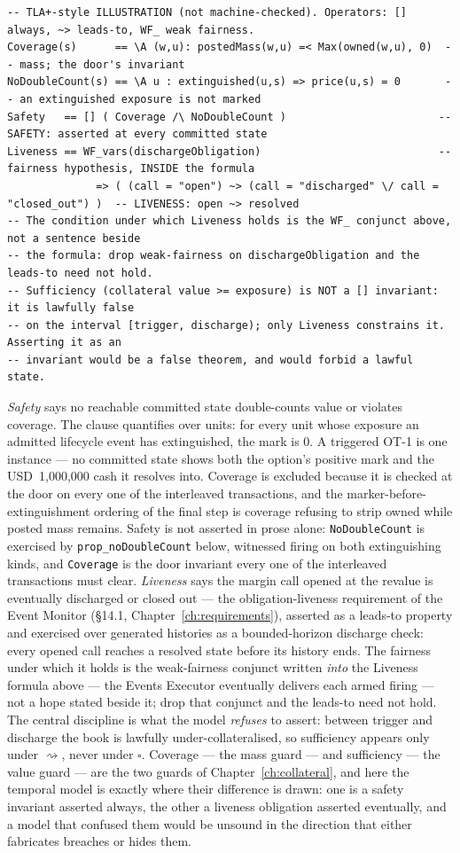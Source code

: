 \documentclass[11pt,a4paper]{article}
\newcommand{\USD}[1]{\mbox{USD~#1}}
\begin{document}
\begin{lstlisting}
-- TLA+-style ILLUSTRATION (not machine-checked). Operators: [] always, ~> leads-to, WF_ weak fairness.
Coverage(s)      == \A (w,u): postedMass(w,u) =< Max(owned(w,u), 0)  -- mass; the door's invariant
NoDoubleCount(s) == \A u : extinguished(u,s) => price(u,s) = 0       -- an extinguished exposure is not marked
Safety   == [] ( Coverage /\ NoDoubleCount )                        -- SAFETY: asserted at every committed state
Liveness == WF_vars(dischargeObligation)                            -- fairness hypothesis, INSIDE the formula
              => ( (call = "open") ~> (call = "discharged" \/ call = "closed_out") )  -- LIVENESS: open ~> resolved
-- The condition under which Liveness holds is the WF_ conjunct above, not a sentence beside
-- the formula: drop weak-fairness on dischargeObligation and the leads-to need not hold.
-- Sufficiency (collateral value >= exposure) is NOT a [] invariant: it is lawfully false
-- on the interval [trigger, discharge); only Liveness constrains it. Asserting it as an
-- invariant would be a false theorem, and would forbid a lawful state.
\end{lstlisting}

\emph{Safety} says no reachable committed state double-counts value or violates coverage.
The clause quantifies over units: for every unit whose exposure an admitted lifecycle event
has extinguished, the mark is $0$. A triggered OT-1 is one instance --- no committed state
shows both the option's positive mark and the \USD{1{,}000{,}000} cash it resolves into. Coverage
is excluded because it is checked at the door on every one of the interleaved transactions,
and the marker-before-extinguishment ordering of the final step is coverage refusing to
strip owned while posted mass remains. Safety is not asserted in prose alone: \texttt{NoDoubleCount} is exercised by
\texttt{prop\_noDoubleCount} below, witnessed firing on both extinguishing kinds, and
\texttt{Coverage} is the door invariant every one of the interleaved transactions must clear.
\emph{Liveness} says the margin call opened at the revalue is eventually discharged or closed
out --- the obligation-liveness requirement of the Event Monitor (\S 14.1,
Chapter~\ref{ch:requirements}), asserted as a leads-to property and exercised over generated
histories as a bounded-horizon discharge check: every opened call reaches a resolved state
before its history ends. The fairness under which it holds is the weak-fairness conjunct
written \emph{into} the Liveness formula above --- the Events Executor eventually delivers each
armed firing --- not a hope stated beside it; drop that conjunct and the leads-to need not
hold. The central discipline is what the model \emph{refuses} to assert: between trigger and
discharge the book is lawfully under-collateralised, so sufficiency appears only under
$\rightsquigarrow$, never under $\square$. Coverage --- the mass guard --- and sufficiency ---
the value guard --- are the two guards of Chapter~\ref{ch:collateral}, and here the temporal
model is exactly where their difference is drawn: one is a safety invariant asserted always,
the other a liveness obligation asserted eventually, and a model that confused them would be
unsound in the direction that either fabricates breaches or hides them.
\end{document}
